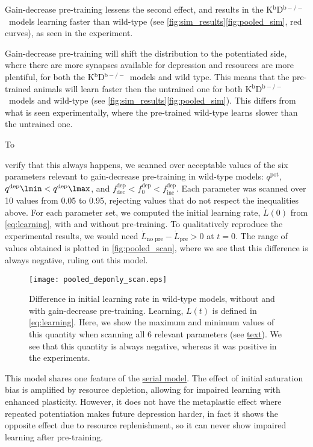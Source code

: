 \documentclass[10pt]{article}
\newcommand{\pot}{^{\text{pot}}}
\newcommand{\dep}{^{\text{dep}}}
\newcommand{\norm}{_0}
\newcommand{\inc}{_{\text{inc}}}
\newcommand{\dec}{_{\text{dec}}}
\newcommand{\KO}{K$^\mathrm{b}$D$^{\mathrm{b}-/-}$}
\begin{document}
Gain-decrease pre-training lessens the second effect, and results in the \KO\ models learning faster than wild-type (see \autoref{fig:sim_results}\ref{fig:pooled_sim}, %
red curves),
as seen in the experiment.

Gain-decrease pre-training will shift the distribution to the potentiated side, where there are more synapses available for depression and resources are more plentiful, for both the \KO\ models and wild type.
This means that the pre-trained animals will learn faster then the untrained one for both \KO\ models and wild-type (see \autoref{fig:sim_results}\ref{fig:pooled_sim}). %
This differs from what is seen experimentally, where the pre-trained wild-type learns slower than the untrained one.

\hypertarget{par:pooled_scan}{To} verify that this always happens, we scanned over acceptable values of the six parameters relevant to gain-decrease pre-training in wild-type models: $q\pot$, $q\dep\lmin < q\dep\lmax$, and $f\dep\dec < f\dep\norm < f\dep\inc$.
Each parameter was scanned over 10 values from 0.05 to 0.95, rejecting values that do not respect the inequalities above.
For each parameter set, we computed the initial learning rate, $\dot{L}(0)$ from \eqref{eq:learning}, with and without pre-training.
To qualitatively reproduce the experimental results, we would need $\dot{L}_\text{no pre} - \dot{L}_\text{pre} > 0$ at $t = 0$.
The range of values obtained is plotted in \autoref{fig:pooled_scan}, where we see that this difference is always negative, ruling out this model.

\begin{figure}
  \centering
  \texttt{[image: pooled\_deponly\_scan.eps]}
  \caption{Difference in initial learning rate in wild-type models, without and with gain-decrease pre-training.
  Learning, $L(t)$ is defined in \eqref{eq:learning}.
  Here, we show the maximum and minimum values of this quantity when scanning all 6 relevant parameters (see \protect\hyperlink{par:pooled_scan}{text}).
  We see that this quantity is always negative, whereas it was positive in the experiments.
  }\label{fig:pooled_scan}
\end{figure}


This model shares one feature of the \hyperref[sec:multistate]{serial model}.
The effect of initial saturation bias is amplified by resource depletion, allowing for impaired learning with enhanced plasticity.
However, it does not have the metaplastic effect where repeated potentiation makes future depression harder, in fact it shows the opposite effect due to resource replenishment, so it can never show impaired learning after pre-training.
\end{document}
